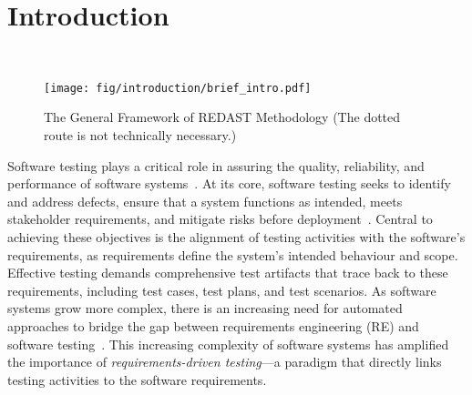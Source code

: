 \section{Introduction}~\label{sec:Introduction}

\begin{figure}
    \centering
    \texttt{[image: fig/introduction/brief\_intro.pdf]}
    \caption{The General Framework of REDAST Methodology (The dotted route is not technically necessary.)}
    \label{fig:brief_intro}
\end{figure}
Software testing plays a critical role in assuring the quality, reliability, and performance of software systems~\cite{significance_se1,significance_se2}. At its core, software testing seeks to identify and address defects, ensure that a system functions as intended, meets stakeholder requirements, and mitigate risks before deployment~\cite{significance_se3}. Central to achieving these objectives is the alignment of testing activities with the software's requirements, as requirements define the system's intended behaviour and scope. Effective testing demands comprehensive test artifacts that trace back to these requirements, including test cases, test plans, and test scenarios. As software systems grow more complex, there is an increasing need for automated approaches to bridge the gap between requirements engineering (RE) and software testing~\cite{taxonomy2014unter}. This increasing complexity of software systems has amplified the importance of \emph{requirements-driven testing}—a paradigm that directly links testing activities to the software requirements.




